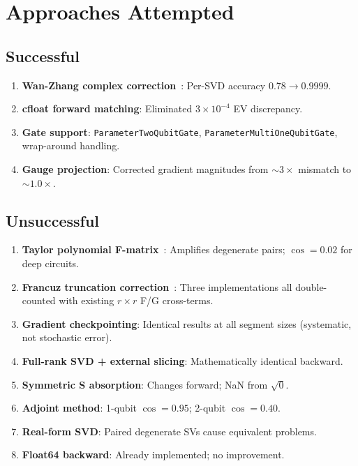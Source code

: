\documentclass[11pt]{article}
\begin{document}
\section{Approaches Attempted}

\subsection{Successful}

\begin{enumerate}
\item \textbf{Wan-Zhang complex correction}~\cite{wan2019automatic}: Per-SVD accuracy $0.78 \to 0.9999$.
\item \textbf{cfloat forward matching}: Eliminated $3 \times 10^{-4}$ EV discrepancy.
\item \textbf{Gate support}: \texttt{ParameterTwoQubitGate}, \texttt{ParameterMultiOneQubitGate}, wrap-around handling.
\item \textbf{Gauge projection}: Corrected gradient magnitudes from ${\sim}3\times$ mismatch to ${\sim}1.0\times$.
\end{enumerate}

\subsection{Unsuccessful}

\begin{enumerate}
\item \textbf{Taylor polynomial F-matrix}~\cite{song2021why}: Amplifies degenerate pairs; $\cos = 0.02$ for deep circuits.
\item \textbf{Francuz truncation correction}~\cite{francuz2025stable}: Three implementations all double-counted with existing $r \times r$ F/G cross-terms.
\item \textbf{Gradient checkpointing}: Identical results at all segment sizes (systematic, not stochastic error).
\item \textbf{Full-rank SVD + external slicing}: Mathematically identical backward.
\item \textbf{Symmetric S absorption}: Changes forward; NaN from $\sqrt{0}$.
\item \textbf{Adjoint method}: 1-qubit $\cos = 0.95$; 2-qubit $\cos = 0.40$.
\item \textbf{Real-form SVD}: Paired degenerate SVs cause equivalent problems.
\item \textbf{Float64 backward}: Already implemented; no improvement.
\end{enumerate}
\end{document}
